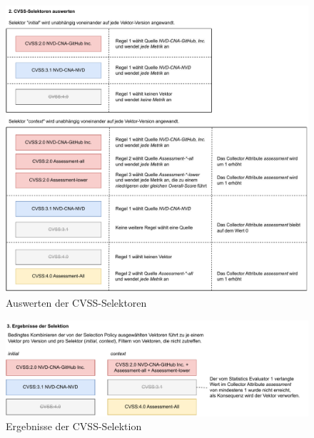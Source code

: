 \begin{figure}[htbp] %
    \centering
    \includegraphics[width=1\textwidth, keepaspectratio]{res/grafiken/cvss-selection-process-selection-2}
    \caption{Auswerten der CVSS-Selektoren}
    \label{fig:cvss-selection-process-selection-2}
\end{figure}

\begin{figure}[htbp] %
    \centering
    \includegraphics[width=1\textwidth, keepaspectratio]{res/grafiken/cvss-selection-process-selection-3}
    \caption{Ergebnisse der CVSS-Selektion}
    \label{fig:cvss-selection-process-selection-3}
\end{figure}

